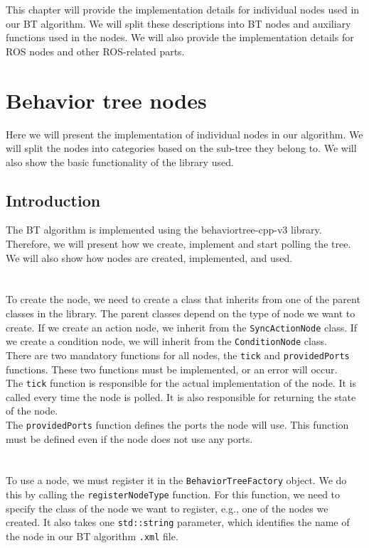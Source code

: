 This chapter will provide the implementation details for individual nodes used in our BT algorithm. We will split these descriptions into BT nodes and auxiliary functions used in the nodes. We will also provide the implementation details for ROS nodes and other ROS-related parts.

\section{Behavior tree nodes}
    Here we will present the implementation of individual nodes in our algorithm. We will split the nodes into categories based on the sub-tree they belong to. We will also show the basic functionality of the library used.
    \subsection{Introduction}
        The BT algorithm is implemented using the behaviortree-cpp-v3 library. Therefore, we will present how we create, implement and start polling the tree. We will also show how nodes are created, implemented, and used.\\\\
        \\
            To create the node, we need to create a class that inherits from one of the parent classes in the library. The parent classes depend on the type of node we want to create. If we create an action node, we inherit from the \texttt{SyncActionNode} class. If we create a condition node, we will inherit from the \texttt{ConditionNode} class.\\
            There are two mandatory functions for all nodes, the \texttt{tick} and \texttt{providedPorts} functions. These two functions must be implemented, or an error will occur.\\
            The \texttt{tick} function is responsible for the actual implementation of the node. It is called every time the node is polled. It is also responsible for returning the state of the node.\\
            The \texttt{providedPorts} function defines the ports the node will use. This function must be defined even if the node does not use any ports.\\\\
        \\
            To use a node, we must register it in the \texttt{BehaviorTreeFactory} object. We do this by calling the \texttt{registerNodeType} function. For this function, we need to specify the class of the node we want to register, e.g., one of the nodes we created. It also takes one \texttt{std::string} parameter, which identifies the name of the node in our BT algorithm \texttt{.xml} file.\\\\
